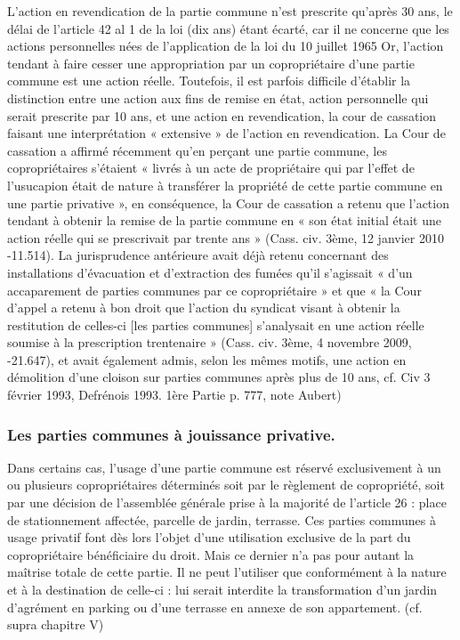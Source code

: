 			L’action en revendication de la partie commune n’est prescrite qu’après 30 ans, le délai de l’article 42 al 1 de la loi (dix ans) étant écarté, car il ne concerne que les actions personnelles nées de l’application de la loi du 10 juillet 1965 Or, l’action tendant à faire cesser une appropriation par un copropriétaire d’une partie commune est une action réelle.
			Toutefois, il est parfois difficile d’établir la distinction entre une action aux fins de remise en état, action personnelle qui serait prescrite par 10 ans, et une action en revendication, la cour de cassation faisant une interprétation « extensive » de l’action en revendication.
			La Cour de cassation a affirmé récemment qu’en perçant une partie commune, les copropriétaires s’étaient « livrés à un acte de propriétaire qui par l’effet de l’usucapion était de nature à transférer la propriété de cette partie commune en une partie privative », en conséquence, la Cour de cassation a retenu que l’action tendant à obtenir la remise de la partie commune en « son état initial était une action réelle qui se prescrivait par trente ans » (Cass. civ. 3ème, 12 janvier 2010 -11.514).
			La jurisprudence antérieure avait déjà retenu concernant des installations d’évacuation et d’extraction des fumées qu’il s’agissait « d’un accaparement de parties communes par ce copropriétaire » et que « la Cour d’appel a retenu à bon droit que l’action du syndicat visant à obtenir la restitution de celles-ci [les parties communes] s’analysait en une action réelle soumise à la prescription trentenaire » (Cass. civ. 3ème, 4 novembre 2009, -21.647), et avait également admis, selon les mêmes motifs, une action en démolition d’une cloison sur parties communes après plus de 10 ans, cf. Civ 3 février 1993, Defrénois 1993. 1ère Partie  p. 777, note Aubert)
		
		\subsubsection{Les parties communes à jouissance privative.}
		
		Dans certains cas, l'usage d'une partie commune est réservé exclusivement à un ou plusieurs copropriétaires déterminés soit par le règlement de copropriété, soit par une décision de l'assemblée générale prise à la majorité de l'article 26 : place de stationnement affectée, parcelle de jardin, terrasse.
		Ces parties communes à usage privatif font dès lors l'objet d'une utilisation exclusive de la part du copropriétaire bénéficiaire du droit.
		Mais ce dernier n'a pas pour autant la maîtrise totale de cette partie. Il ne peut l'utiliser que conformément à la nature et à la destination de celle-ci : lui serait interdite la transformation d'un jardin d'agrément en parking ou d'une terrasse en annexe de son appartement. (cf. supra chapitre V)
		
